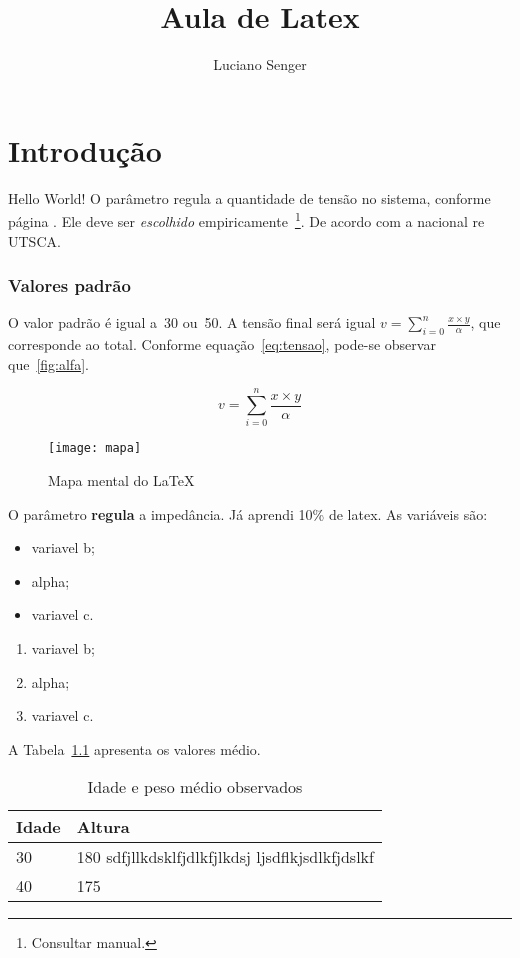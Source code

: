 \documentclass[a4paper, brazil, 12pt , onecolumn]{report}
\title{Aula de Latex}
\author{Luciano Senger}
\begin{document}
	\maketitle
	\tableofcontents
	\listoffigures
	\listoftables
\chapter{Introdução}

Hello World!
O parâmetro  regula a quantidade de tensão no sistema, conforme página \pageref{sec:mat}.
Ele deve ser \textit{escolhido} empiricamente~\footnote{Consultar manual.}.
De acordo com a nacional re \mbox{UTSCA}. 
\subsection{Valores padrão}
O valor padrão é igual a~30 ou~50.
A tensão final será igual $v = \sum_{i=0}^n \frac{x \times y}{\alpha}$, que corresponde ao total.
Conforme equação~\ref{eq:tensao}, pode-se observar que~\ref{fig:alfa}.

\begin{equation}
	v = \sum_{i=0}^n \frac{x \times y}{\alpha}
\end{equation}\label{eq:tensao}

\begin{figure}[htb]
	\centering
	\texttt{[image: mapa]}
	\caption{Mapa mental do \LaTeX}
\end{figure}\label{fig:alfa}

O parâmetro {\Huge {}} \textbf{regula} a impedância.
Já aprendi 10\% de latex.
As variáveis são:
\begin{itemize}
	\item variavel b;
	\item alpha;
	\item variavel c.
\end{itemize}

\begin{enumerate}
	\item variavel b;
	\item alpha;
	\item variavel c.
\end{enumerate}
A Tabela~\ref{tab:idade} apresenta os valores médio.
\begin{table}[htb]
	\caption{Idade e peso médio observados}\label{tab:idade}
	\centering
	
	\begin{tabularx}{0.9\linewidth}{lX}
		\hline
		\bf Idade & \bf Altura \\ 
		\hline
		30 & 180 sdfjllkdsklfjdlkfjlkdsj ljsdflkjsdlkfjdslkf\\
		40 & 175 \\
		\hline
		\end{tabularx}
\end{table}
\end{document}
